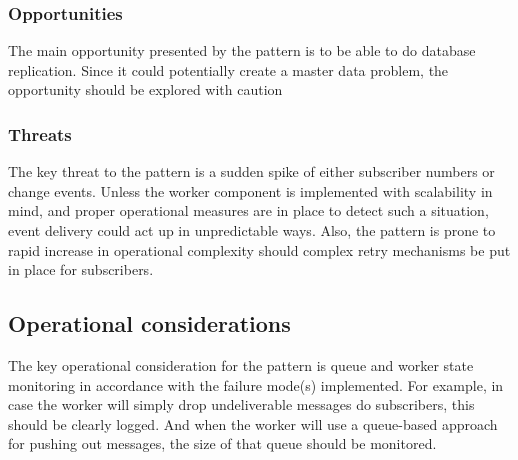 \documentclass[10pt,a4paper]{article}
\begin{document}
\subsubsection{Opportunities}
The main opportunity presented by the pattern is to be able to do database replication. Since it could potentially create a master data problem, the opportunity should be explored with caution

\subsubsection{Threats}
The key threat to the pattern is a sudden spike of either subscriber numbers or change events. Unless the worker component is implemented with scalability in mind, and proper operational measures are in place to detect such a situation, event delivery could act up in unpredictable ways. Also, the pattern is prone to rapid increase in operational complexity should complex retry mechanisms be put in place for subscribers.

\subsection{Operational considerations}
The key operational consideration for the pattern is queue and worker state monitoring in accordance with the failure mode(s) implemented. For example, in case the worker will simply drop undeliverable messages do subscribers, this should be clearly logged. And when the worker will use a queue-based approach for pushing out messages, the size of that queue should be monitored. 
\end{document}
